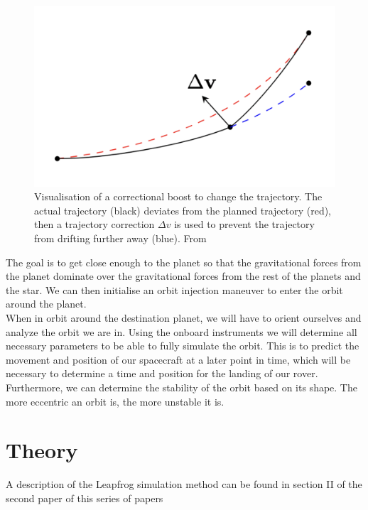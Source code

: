 \documentclass[reprint,english,notitlepage]{revtex4-2}
\begin{document}
\begin{figure}[h]
    \centering
    \includegraphics[scale=0.12]{Figures/boost_fig}
    \caption{Visualisation of a correctional boost to change the trajectory. The actual trajectory (black) deviates from the planned trajectory (red), then a trajectory
        correction $\Delta v$ is used to prevent the trajectory from drifting further away (blue). From %
    }\label{fig:boost_fig}
\end{figure}

The goal is to get close enough to the planet so that the gravitational forces from the planet dominate over the gravitational forces from the rest of the planets and the star.
We can then initialise an orbit injection maneuver to enter the orbit around the planet.\\

When in orbit around the destination planet, we will have to orient ourselves and analyze the orbit we are in.
Using the onboard instruments we will determine all necessary parameters to be able to fully simulate the orbit.
This is to predict the movement and position of our spacecraft at a later point in time, which will be necessary to determine a time and position for the landing of our rover.
Furthermore, we can determine the stability of the orbit based on its shape.
The more eccentric an orbit is, the more unstable it is.



\section{Theory} \label{sec: theory}
A description of the Leapfrog simulation method can be found in section II of the second paper %
of this series of papers
\end{document}
